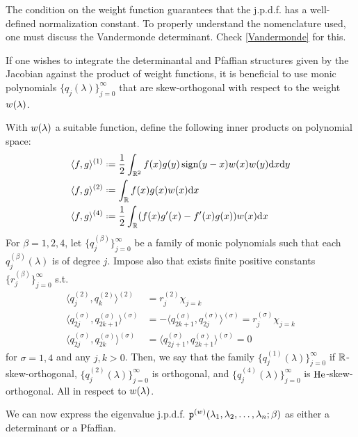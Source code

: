 The condition on the weight function guarantees that the j.p.d.f. has a well-defined normalization constant. To properly understand the nomenclature used, one must discuss the Vandermonde determinant. Check \ref{Vandermonde} for this. 

If one wishes to integrate the determinantal and Pfaffian structures given by the Jacobian against the product of weight functions, it is beneficial to use monic polynomials $\{q_j(\lambda)\}_{j=0}^\infty$ that are skew-orthogonal with respect to the weight $w(\lambda)$.

\begin{definicao}
	With $w(\lambda)$ a suitable function, define the following inner products on polynomial space:
	\begin{align}
		\langle f,g \rangle^{(1)} & \deff \frac{1}{2} \int_{\R^2} f(x) g(y) \sign(y-x) \wf(x) \wf(y) \dd x \dd y \\
		\langle f,g \rangle^{(2)} & \deff \int_{\R} f(x) g(x) \wf(x) \dd x \\
		\langle f,g \rangle^{(4)} & \deff \frac{1}{2} \int_{\R} (f(x)g'(x) - f'(x)g(x)) \wf(x) \dd x
	\end{align}
	For $\beta = 1,2,4$, let $\{q_j^{(\beta)}\}_{j=0}^\infty$ be a family of monic polynomials such that each $q_j^{(\beta)}(\lambda)$ is of degree $j$. Impose also that exists finite positive constants $\{r_j^{(\beta)}\}_{j=0}^\infty$ s.t.
	\begin{align}
	\langle q_j^{(2)}, q_k^{(2)} \rangle^{(2)} & = r_j^{(2)} \chi_{j=k} \\
	\langle q^{(\sigma)}_{2j}, q^{(\sigma)}_{2k+1} \rangle^{(\sigma)} & = - \langle q^{(\sigma)}_{2k+1}, q^{(\sigma)}_{2j} \rangle^{(\sigma)} = r_j^{(\sigma)} \chi_{j=k} \\
	\langle q^{(\sigma)}_{2j}, q^{(\sigma)}_{2k} \rangle^{(\sigma)} & = \langle q^{(\sigma)}_{2j+1}, q^{(\sigma)}_{2k+1} \rangle^{(\sigma)} = 0
	\end{align}	
	for $\sigma = 1, 4$ and any $j,k>0$. Then, we say that the family $\{q_j^{(1)}(\lambda)\}_{j=0}^\infty$ if $\mathbb{R}$-skew-orthogonal, $\{q_j^{(2)}(\lambda)\}_{j=0}^\infty$ is orthogonal, and $\{q_j^{(4)}(\lambda)\}_{j=0}^\infty$ is $\mathrm{He}$-skew-orthogonal. All in respect to $w(\lambda)$.
\end{definicao}

We can now express the eigenvalue j.p.d.f. $\mathtt{p}^{(w)}(\lambda_1, \lambda_2, \dots, \lambda_n;\beta)$ as either a determinant or a Pfaffian. 

